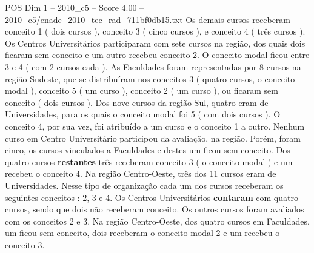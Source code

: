 \begin{textsample}{POS Dim 1 – 2010\_c5 – Score 4.00 – 2010\_c5/enade\_2010\_tec\_rad\_711bf0db15.txt}
Os demais cursos receberam conceito 1 ( dois cursos ), conceito 3 ( cinco cursos ), e conceito 4 ( três cursos ).
Os Centros Universitários participaram com sete cursos na região, dos quais dois ficaram sem conceito e um outro recebeu conceito 2.
O conceito modal ficou entre 3 e 4 ( com 2 cursos cada ).
As Faculdades foram representadas por 8 cursos na região Sudeste, que se distribuíram nos conceitos 3 ( quatro cursos, o conceito modal ), conceito 5 ( um curso ), conceito 2 ( um curso ), ou ficaram sem conceito ( dois cursos ).
Dos nove cursos da região Sul, quatro eram de Universidades, para os quais o conceito modal foi 5 ( com dois cursos ).
O conceito 4, por sua vez, foi atribuído a um curso e o conceito 1 a outro.
Nenhum curso em Centro Universitário participou da avaliação, na região.
Porém, foram cinco, os cursos vinculados a Faculdades e destes um ficou sem conceito.
Dos quatro cursos \textbf{restantes} três receberam conceito 3 ( o conceito modal ) e um recebeu o conceito 4.
Na região Centro-Oeste, três dos 11 cursos eram de Universidades.
Nesse tipo de organização cada um dos cursos receberam os seguintes conceitos : 2, 3 e 4.
Os Centros Universitários \textbf{contaram} com quatro cursos, sendo que dois não receberam conceito.
Os outros cursos foram avaliados com os conceitos 2 e 3.
Na região Centro-Oeste, dos quatro cursos em Faculdades, um ficou sem conceito, dois receberam o conceito modal 2 e um recebeu o conceito 3.

\end{textsample}
